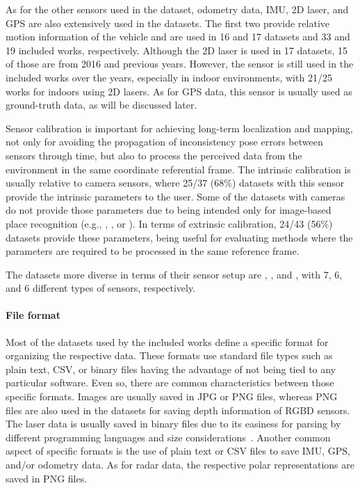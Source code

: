 As for the other sensors used in the dataset, odometry data, IMU, 2D laser, and GPS are also extensively used in the datasets.
The first two provide relative motion information of the vehicle and are used in 16 and 17 datasets and 33 and 19 included works, respectively.
Although the 2D laser is used in 17 datasets, 15 of those are from 2016 and previous years. However, the sensor is still used in the included works over the years, especially in indoor environments, with 21/25 works for indoors using 2D lasers.
As for GPS data, this sensor is usually used as ground-truth data, as will be discussed later.

Sensor calibration is important for achieving long-term localization and mapping, not only for avoiding the propagation of inconsistency pose errors between sensors through time, but also to process the perceived data from the environment in the same coordinate referential frame. The intrinsic calibration is usually relative to camera sensors, where 25/37 (68\%) datasets with this sensor provide the intrinsic parameters to the user. Some of the datasets with cameras do not provide those parameters due to being intended only for image-based place recognition (e.g., , , or ).
In terms of extrinsic calibration, 24/43 (56\%) datasets provide these parameters, being useful for evaluating methods where the parameters are required to be processed in the same reference frame.

The datasets more diverse in terms of their sensor setup are , , and , with 7, 6, and 6 different types of sensors, respectively.


\paragraph{File format}

Most of the datasets used by the included works define a specific format for organizing the respective data. These formats use standard file types such as plain text, CSV, or binary files having the advantage of not being tied to any particular software. Even so, there are common characteristics between those specific formats.
Images are usually saved in JPG or PNG files, whereas PNG files are also used in the datasets for saving depth information of RGBD sensors.
The laser data is usually saved in binary files due to its easiness for parsing by different programming languages and size considerations~\parencite{dataset:kitti,dataset:oxford-robotcar}.
Another common aspect of specific formats is the use of plain text or CSV files to save IMU, GPS, and/or odometry data.
As for radar data, the respective polar representations are saved in PNG files.

